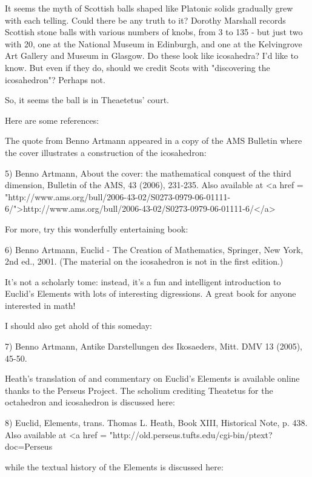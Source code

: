 It seems the myth of Scottish balls shaped like Platonic solids
gradually grew with each telling.  Could there be any truth to it?
Dorothy Marshall records Scottish stone balls with various numbers 
of knobs, from 3 to 135 - but just two with 20, one at the National 
Museum in Edinburgh, and one at the Kelvingrove Art Gallery and Museum 
in Glasgow.  Do these look like icosahedra?  I'd like to know.  But 
even if they do, should we credit Scots with "discovering the 
icosahedron"?  Perhaps not. 

So, it seems the ball is in Theaetetus' court.

Here are some references:

The quote from Benno Artmann appeared in a copy of the AMS Bulletin
where the cover illustrates a construction of the icosahedron: 

5) Benno Artmann, About the cover: the mathematical conquest of 
the third dimension, Bulletin of the AMS, 43 (2006), 231-235.
Also available at 
<a href = "http://www.ams.org/bull/2006-43-02/S0273-0979-06-01111-6/">http://www.ams.org/bull/2006-43-02/S0273-0979-06-01111-6/</a>

For more, try this wonderfully entertaining book:

6) Benno Artmann, Euclid - The Creation of Mathematics, Springer, 
New York, 2nd ed., 2001.  (The material on the icosahedron is not 
in the first edition.)

It's not a scholarly tome: instead, it's a fun and intelligent 
introduction to Euclid's Elements with lots of interesting digressions.
A great book for anyone interested in math!

I should also get ahold of this someday:

7) Benno Artmann, Antike Darstellungen des Ikosaeders, Mitt. DMV 13 
(2005), 45-50.

Heath's translation of and commentary on Euclid's Elements is available
online thanks to the Perseus Project.  The scholium crediting Theatetus
for the octahedron and icosahedron is discussed here:

8) Euclid, Elements, trans. Thomas L. Heath, Book XIII, 
Historical Note, p. 438.  Also available at 
<a href = "http://old.perseus.tufts.edu/cgi-bin/ptext?doc=Perseus%

while the textual history of the Elements is discussed here:

